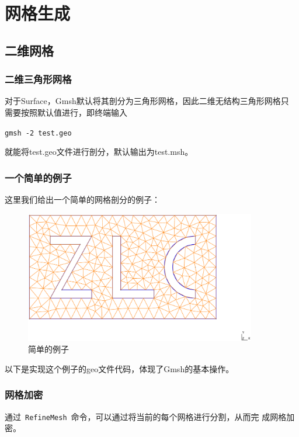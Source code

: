 \documentclass[a4paper,  11pt]{ctexart}
\newcommand\inputccode[1]{}
\begin{document}
 \section{网格生成}
\subsection{二维网格}
\subsubsection{二维三角形网格}
对于Surface，Gmsh默认将其剖分为三角形网格，因此二维无结构三角形网格只
需要按照默认值进行，即终端输入\par
\verb|gmsh -2 test.geo| \par
就能将test.geo文件进行剖分，默认输出为test.msh。\par
\subsubsection{一个简单的例子}
这里我们给出一个简单的网格剖分的例子：
\begin{figure}[H]
	\begin{center}
		\includegraphics[width=0.9\textwidth]{zlc.eps}
	\end{center}
	\caption{简单的例子}
\end{figure}
以下是实现这个例子的geo文件代码，体现了Gmsh的基本操作。
\inputccode{zlc.geo}
\subsubsection{网格加密}
通过~\verb|RefineMesh|~命令，可以通过将当前的每个网格进行分割，从而完
成网格加密。
\end{document}
